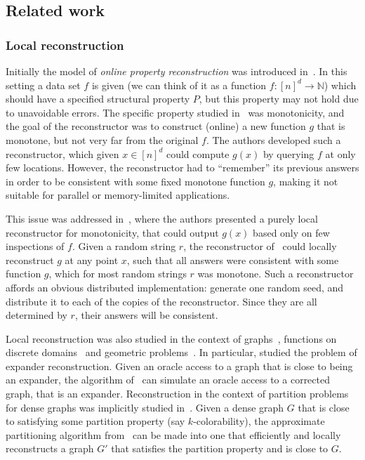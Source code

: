 \documentclass[10pt]{article}
\theoremstyle{definition}
\numberwithin{equation}{section}
\newcommand{\naturals}{{\mathbb N}}
\begin{document}
\subsection{Related work}

\subsubsection{Local reconstruction}

Initially the model of \emph{online property reconstruction} was introduced in~\cite{datarecon}. In this setting a data set $f$ is given (we can think of it as a function $f:[n]^d \to \naturals$) which should have a specified structural property $P$, but this property may not
hold due to unavoidable errors.
The specific property studied in~\cite{datarecon} was monotonicity, and the goal of the reconstructor was to construct (online) a new function $g$ that is monotone, but not very far from the original $f$. The authors developed such a reconstructor, which given $x \in [n]^d$ could compute $g(x)$ by querying $f$ at only few locations. However, the reconstructor had to ``remember'' its previous answers in order to be consistent with some fixed monotone function $g$, making it not suitable for parallel or memory-limited applications.

This issue was addressed in~\cite{monorecon}, where the authors
presented a purely local reconstructor for monotonicity, that could output $g(x)$ based only on few inspections of $f$. Given a random string $r$, the reconstructor of~\cite{monorecon} could locally reconstruct $g$ at any point $x$, such that all answers were consistent with some function $g$, which for most random strings $r$ was monotone.
Such a reconstructor affords an obvious
distributed implementation: generate one random seed, and distribute it to each of
the copies of the reconstructor. Since they are all determined by $r$, their answers will be consistent.

Local reconstruction was also studied in the context of 
graphs~\cite{exprecon,ggr}, 
functions on discrete domains~\cite{lb_recon,lip_recon} and geometric problems~\cite{geomrecon}. In particular, \cite{exprecon} studied the problem of expander reconstruction. Given an oracle access to a graph that is close to being an expander, the algorithm of~\cite{exprecon} can simulate an oracle access to a corrected graph, that is an expander. Reconstruction in the context of partition problems for dense graphs was implicitly studied in~\cite{ggr}. Given a dense graph $G$ that is close to satisfying some partition property (say $k$-colorability),
the approximate partitioning algorithm from~\cite{ggr} can be made into one that efficiently and locally reconstructs a graph $G'$ that satisfies the partition property and is close to $G$.
\end{document}
